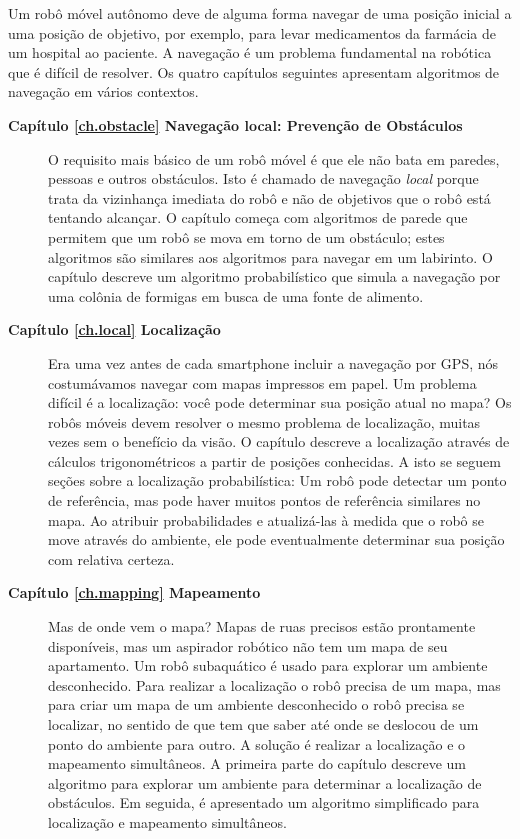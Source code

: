 Um robô móvel autônomo deve de alguma forma navegar de uma posição inicial a uma posição de objetivo, por exemplo, para levar medicamentos da farmácia de um hospital ao paciente. A navegação é um problema fundamental na robótica que é difícil de resolver. Os quatro capítulos seguintes apresentam algoritmos de navegação em vários contextos.
\begin{description}
\item [\textbf{Capítulo \ref{ch.obstacle} Navegação local: Prevenção de Obstáculos}] O requisito mais básico de um robô móvel é que ele não bata em paredes, pessoas e outros obstáculos. Isto é chamado de navegação \emph{local} porque trata da vizinhança imediata do robô e não de objetivos que o robô está tentando alcançar. O capítulo começa com algoritmos de parede que permitem que um robô se mova em torno de um obstáculo; estes algoritmos são similares aos algoritmos para navegar em um labirinto. O capítulo descreve um algoritmo probabilístico que simula a navegação por uma colônia de formigas em busca de uma fonte de alimento.
\smallskip
\item [\textbf{Capítulo \ref{ch.local} Localização}] Era uma vez antes de cada smartphone incluir a navegação por GPS, nós costumávamos navegar com mapas impressos em papel. Um problema difícil é a localização: você pode determinar sua posição atual no mapa? Os robôs móveis devem resolver o mesmo problema de localização, muitas vezes sem o benefício da visão. O capítulo descreve a localização através de cálculos trigonométricos a partir de posições conhecidas. A isto se seguem seções sobre a localização probabilística: Um robô pode detectar um ponto de referência, mas pode haver muitos pontos de referência similares no mapa. Ao atribuir probabilidades e atualizá-las à medida que o robô se move através do ambiente, ele pode eventualmente determinar sua posição com relativa certeza.
\smallskip
\item [\textbf{Capítulo \ref{ch.mapping} Mapeamento}] Mas de onde vem o mapa? Mapas de ruas precisos estão prontamente disponíveis, mas um aspirador robótico não tem um mapa de seu apartamento. Um robô subaquático é usado para explorar um ambiente desconhecido. Para realizar a localização o robô precisa de um mapa, mas para criar um mapa de um ambiente desconhecido o robô precisa se localizar, no sentido de que tem que saber até onde se deslocou de um ponto do ambiente para outro. A solução é realizar a localização e o mapeamento simultâneos. A primeira parte do capítulo descreve um algoritmo para explorar um ambiente para determinar a localização de obstáculos. Em seguida, é apresentado um algoritmo simplificado para localização e mapeamento simultâneos.

\end{description}
